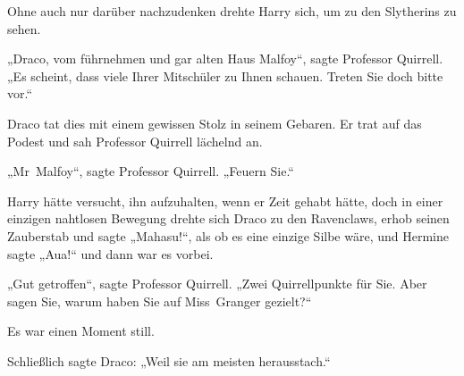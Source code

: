 Ohne auch nur darüber nachzudenken drehte Harry sich, um zu den Slytherins zu sehen.

„Draco, vom führnehmen und gar alten Haus Malfoy“, sagte Professor Quirrell. „Es scheint, dass viele Ihrer Mitschüler zu Ihnen schauen. Treten Sie doch bitte vor.“

Draco tat dies mit einem gewissen Stolz in seinem Gebaren. Er trat auf das Podest und sah Professor Quirrell lächelnd an.

„Mr~Malfoy“, sagte Professor Quirrell. „Feuern Sie.“

Harry hätte versucht, ihn aufzuhalten, wenn er Zeit gehabt hätte, doch in einer einzigen nahtlosen Bewegung drehte sich Draco zu den Ravenclaws, erhob seinen Zauberstab und sagte „Mahasu!“, als ob es eine einzige Silbe wäre, und Hermine sagte „Aua!“ und dann war es vorbei.

„Gut getroffen“, sagte Professor Quirrell. „Zwei Quirrellpunkte für Sie. Aber sagen Sie, warum haben Sie auf Miss~Granger gezielt?“

Es war einen Moment still.

Schließlich sagte Draco: „Weil sie am meisten herausstach.“

